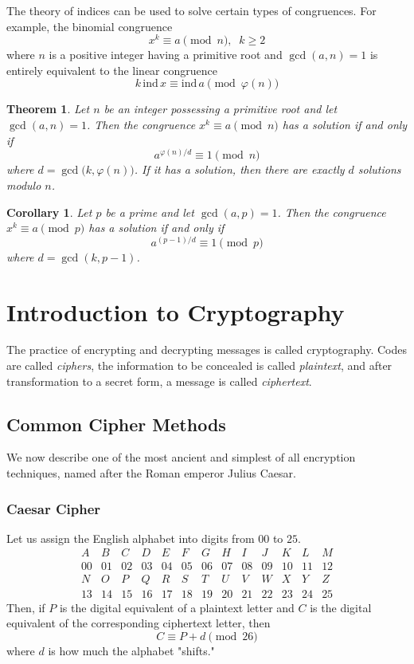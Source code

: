 \documentclass{article}
\newtheorem{theorem}{Theorem}[section]
\newtheorem{corollary}{Corollary}[theorem]
\theoremstyle{remark}
\theoremstyle{definition}
\begin{document}
The theory of indices can be used to solve certain types of congruences. For example, the binomial congruence
\[x^k \equiv a \pmod{n}, \;\; k \geq 2\]
where $n$ is a positive integer having a primitive root and $\gcd(a, n) = 1$ is entirely equivalent to the linear congruence 
\[k \,\text{ind} \, x \equiv \text{ind} \, a \pmod{\varphi(n)}\]

\begin{theorem}
Let $n$ be an integer possessing a primitive root and let $\gcd(a, n) = 1$. Then the congruence $x^k \equiv a \pmod{n}$ has a solution if and only if 
\[a^{\varphi(n)/d} \equiv 1 \pmod{n}\]
where $d = \gcd\big(k, \varphi(n)\big)$. If it has a solution, then there are exactly $d$ solutions modulo $n$. 
\end{theorem}

\begin{corollary}
Let $p$ be a prime and let $\gcd(a, p) = 1$. Then the congruence $x^k \equiv a \pmod{p}$ has a solution if and only if 
\[a^{(p-1)/d} \equiv 1 \pmod{p}\]
where $d = \gcd(k, p-1)$. 
\end{corollary}

\section{Introduction to Cryptography}

The practice of encrypting and decrypting messages is called cryptography. Codes are called \textit{ciphers}, the information to be concealed is called \textit{plaintext}, and after transformation to a secret form, a message is called \textit{ciphertext}. 

\subsection{Common Cipher Methods}

We now describe one of the most ancient and simplest of all encryption techniques, named after the Roman emperor Julius Caesar. 

\subsubsection{Caesar Cipher}
Let us assign the English alphabet into digits from $00$ to $25$. 
\[\begin{array}{cccccccccccccc}
    A & B & C & D& E & F & G&H&I&J&K&L&M \\
    00 & 01 & 02 & 03 & 04&05&06&07&08&09&10&11&12 \\
    N&O&P&Q&R&S&T&U&V&W&X&Y&Z\\
    13&14&15&16&17&18&19&20&21&22&23&24&25
\end{array}\]
Then, if $P$ is the digital equivalent of a plaintext letter and $C$ is the digital equivalent of the corresponding ciphertext letter, then 
\[C \equiv P + d \pmod{26}\]
where $d$ is how much the alphabet "shifts."
\end{document}
